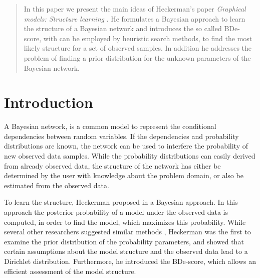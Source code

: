 \documentclass{article}
\begin{document}
 


\begin{abstract} 
	In this paper we present the main ideas of Heckerman's paper \textit{Graphical models: Structure learning}
	\cite{original}. He formulates a Bayesian approach to learn the structure of a Bayesian network and
	introduces the so called BDe-score, with can be employed by heuristic search methods, to find
	the most likely structure for a set of observed samples. In addition he addresses the problem of
	finding a prior distribution for the unknown parameters of the Bayesian network.
\end{abstract} 


\section{Introduction}
A Bayesian network, is a common model to represent the conditional dependencies between random variables.
If the dependencies and probability distributions are known, the network can be used to interfere the
probability of new observed data samples. While the probability distributions can easily derived
from already observed data, the structure of the network has either be determined by the user with
knowledge about the problem domain, or also be estimated from the observed data.

To learn the structure, Heckerman proposed in \cite{original,hcg} a Bayesian approach. In this approach the
posterior probability of a model under the observed data is computed, in order to find the model,
which maximizes this probability. While several other researchers suggested similar methods
\cite{buntine, cooper, spiegelhalter}, Heckerman was the first to examine the prior distribution of the
probability parameters, and showed that certain assumptions about the model structure and the
observed data lead to a Dirichlet distribution. Furthermore, he introduced the BDe-score, which
allows an efficient assessment of the model structure.
\end{document}
